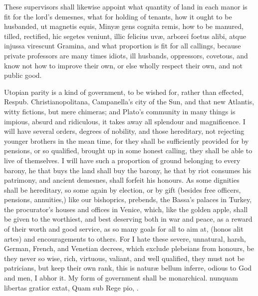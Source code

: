 {These supervisors shall likewise appoint what quantity of land in each
manor is fit for the lord's demesnes, what for holding of tenants,
how it ought to be husbanded, ut magnetis equis, Miny\ae{} gens
cognita remis, how to be manured, tilled, rectified, hic segetes
veniunt, illic felicius uv\ae{}, arborei foetus alibi, atque injussa
virescunt Gramina, and what proportion is fit for all callings, because
private professors are many times idiots, ill husbands, oppressors,
covetous, and know not how to improve their own, or else wholly respect
their own, and not public good.

Utopian parity is a kind of government, to be wished for, rather
than effected, Respub. Christianopolitana, Campanella's city of the
Sun, and that new Atlantis, witty fictions, but mere chimeras; and
Plato's community in many things is impious, absurd and ridiculous, it
takes away all splendour and magnificence. I will have several orders,
degrees of nobility, and those hereditary, not rejecting younger
brothers in the mean time, for they shall be sufficiently provided for
by pensions, or so qualified, brought up in some honest calling, they
shall be able to live of themselves. I will have such a proportion of
ground belonging to every barony, he that buys the land shall buy the
barony, he that by riot consumes his patrimony, and ancient demesnes,
shall forfeit his honours. As some dignities shall be hereditary,
so some again by election, or by gift (besides free officers, pensions,
annuities,) like our bishoprics, prebends, the Bassa's palaces in
Turkey, the procurator's houses and offices in Venice, which, like
the golden apple, shall be given to the worthiest, and best deserving
both in war and peace, as a reward of their worth and good service, as
so many goals for all to aim at, (honos alit artes) and encouragements
to others. For I hate these severe, unnatural, harsh, German, French,
and Venetian decrees, which exclude plebeians from honours, be they
never so wise, rich, virtuous, valiant, and well qualified, they must
not be patricians, but keep their own rank, this is natur\ae{} bellum
inferre, odious to God and men, I abhor it. My form of government shall
be monarchical.
nunquam libertas gratior extat,
Quam sub Rege pio, \etc.

}
